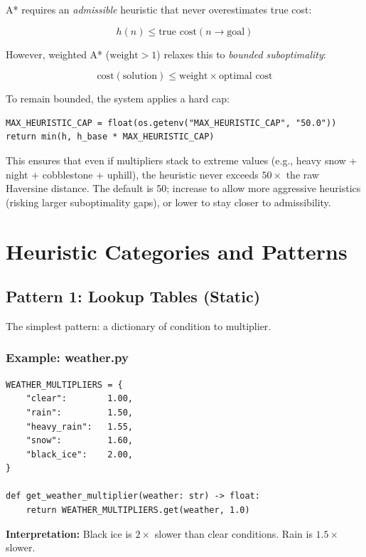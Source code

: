 \documentclass[12pt,a4paper]{article}
\begin{document}
A* requires an \textit{admissible} heuristic that never overestimates true cost:

\[
h(n) \leq \text{true cost}(n \to \text{goal})
\]

However, weighted A* ($\text{weight} > 1$) relaxes this to \textit{bounded suboptimality}:

\[
\text{cost}(\text{solution}) \leq \text{weight} \times \text{optimal cost}
\]

To remain bounded, the system applies a hard cap:

\begin{lstlisting}
MAX_HEURISTIC_CAP = float(os.getenv("MAX_HEURISTIC_CAP", "50.0"))
return min(h, h_base * MAX_HEURISTIC_CAP)
\end{lstlisting}

This ensures that even if multipliers stack to extreme values (e.g., heavy snow + night + cobblestone + uphill), the heuristic never exceeds $50\times$ the raw Haversine distance. The default is 50; increase to allow more aggressive heuristics (risking larger suboptimality gaps), or lower to stay closer to admissibility.

\newpage

\section{Heuristic Categories and Patterns}

\subsection{Pattern 1: Lookup Tables (Static)}

The simplest pattern: a dictionary of condition to multiplier.

\subsubsection{Example: weather.py}

\begin{lstlisting}
WEATHER_MULTIPLIERS = {
    "clear":        1.00,
    "rain":         1.50,
    "heavy_rain":   1.55,
    "snow":         1.60,
    "black_ice":    2.00,
}

def get_weather_multiplier(weather: str) -> float:
    return WEATHER_MULTIPLIERS.get(weather, 1.0)
\end{lstlisting}

\textbf{Interpretation:} Black ice is $2\times$ slower than clear conditions. Rain is $1.5\times$ slower.
\end{document}
